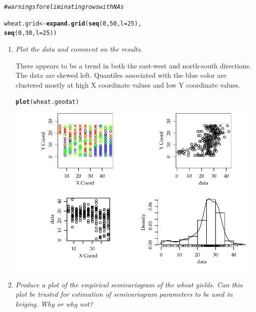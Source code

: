 \documentclass{article}\usepackage[]{graphicx}\usepackage[]{color}
\makeatletter
\def\maxwidth{ %
  \ifdim\Gin@nat@width>\linewidth
    \linewidth
  \else
    \Gin@nat@width
  \fi
}
\newcommand{\hlnum}[1]{\textcolor[rgb]{0.686,0.059,0.569}{#1}}%
\newcommand{\hlcom}[1]{\textcolor[rgb]{0.678,0.584,0.686}{\textit{#1}}}%
\newcommand{\hlstd}[1]{\textcolor[rgb]{0.345,0.345,0.345}{#1}}%
\newcommand{\hlkwb}[1]{\textcolor[rgb]{0.69,0.353,0.396}{#1}}%
\newcommand{\hlkwc}[1]{\textcolor[rgb]{0.333,0.667,0.333}{#1}}%
\newcommand{\hlkwd}[1]{\textcolor[rgb]{0.737,0.353,0.396}{\textbf{#1}}}%
\newenvironment{kframe}{%
 \def\at@end@of@kframe{}%
 \ifinner\ifhmode%
  \def\at@end@of@kframe{\end{minipage}}%
  \begin{minipage}{\columnwidth}%
 \fi\fi%
 \def\FrameCommand##1{\hskip\@totalleftmargin \hskip-\fboxsep
 \colorbox{shadecolor}{##1}\hskip-\fboxsep
     \hskip-\linewidth \hskip-\@totalleftmargin \hskip\columnwidth}%
 \MakeFramed {\advance\hsize-\width
   \@totalleftmargin\z@ \linewidth\hsize
   \@setminipage}}%
 {\par\unskip\endMakeFramed%
 \at@end@of@kframe}
\newenvironment{knitrout}{}{} %
\makeatother
\begin{document}
\begin{enumerate}
\begin{knitrout}
\begin{kframe}
\begin{alltt}
\hlcom{# warnings for eliminating rows with NAs}

\hlstd{wheat.grid} \hlkwb{<-} \hlkwd{expand.grid}\hlstd{(}\hlkwd{seq}\hlstd{(}\hlnum{0}\hlstd{,}\hlnum{50}\hlstd{,}\hlkwc{l}\hlstd{=}\hlnum{25}\hlstd{),}
                           \hlkwd{seq}\hlstd{(}\hlnum{0}\hlstd{,}\hlnum{30}\hlstd{,}\hlkwc{l}\hlstd{=}\hlnum{25}\hlstd{))}
\end{alltt}
\end{kframe}
\end{knitrout}

\begin{enumerate}
\item%
{\it Plot the data and comment on the results.}

There appears to be a trend in both the east-west and north-south directions. The data are skewed left. Quantiles associated with the blue color are clustered mostly at high X coordinate values and low Y coordinate values.

\begin{knitrout}\footnotesize
{}\color{fgcolor}\begin{kframe}
\begin{alltt}
\hlkwd{plot}\hlstd{(wheat.geodat)}
\end{alltt}
\end{kframe}

{\centering \includegraphics[width=\maxwidth]{figure/prob1a-1} 

}



\end{knitrout}

\item 
{\it Produce a plot of the empirical semivariogram of the wheat yields. Can this plot be trusted for estimation of semivariogram parameters to be used in kriging. Why or why not?}


\end{enumerate}
\end{enumerate}
\end{document}
